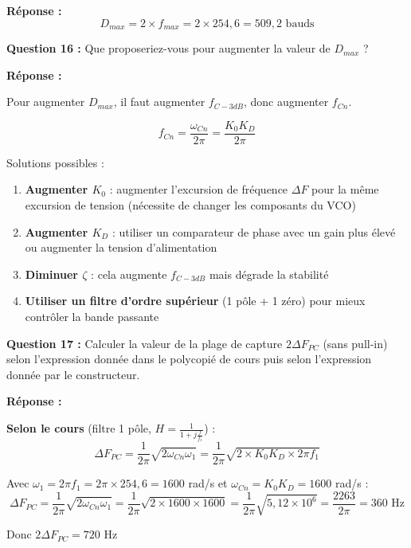 \documentclass[a4paper,11pt]{article}
\begin{document}
\vspace{0.3cm}
\textbf{Réponse :}
\[
D_{max} = 2 \times f_{max} = 2 \times 254{,}6 = \boxed{509{,}2 \text{ bauds}}
\]

\vspace{0.5cm}
\textbf{Question 16 :} Que proposeriez-vous pour augmenter la valeur de $D_{max}$ ?

\vspace{0.3cm}
\textbf{Réponse :}

Pour augmenter $D_{max}$, il faut augmenter $f_{C-3dB}$, donc augmenter $f_{Cn}$.

\[
f_{Cn} = \frac{\omega_{Cn}}{2\pi} = \frac{K_0 K_D}{2\pi}
\]

Solutions possibles :
\begin{enumerate}
    \item \textbf{Augmenter $K_0$} : augmenter l'excursion de fréquence $\Delta F$ pour la même excursion de tension (nécessite de changer les composants du VCO)
    \item \textbf{Augmenter $K_D$} : utiliser un comparateur de phase avec un gain plus élevé ou augmenter la tension d'alimentation
    \item \textbf{Diminuer $\zeta$} : cela augmente $f_{C-3dB}$ mais dégrade la stabilité
    \item \textbf{Utiliser un filtre d'ordre supérieur} (1 pôle + 1 zéro) pour mieux contrôler la bande passante
\end{enumerate}

\vspace{0.5cm}
\textbf{Question 17 :} Calculer la valeur de la plage de capture $2\Delta F_{PC}$ (sans pull-in) selon l'expression donnée dans le polycopié de cours puis selon l'expression donnée par le constructeur.

\vspace{0.3cm}
\textbf{Réponse :}

\textbf{Selon le cours} (filtre 1 pôle, $H = \frac{1}{1+j\frac{f}{f_1}}$) :
\[
\Delta F_{PC} = \frac{1}{2\pi}\sqrt{2 \omega_{Cn} \omega_1} = \frac{1}{2\pi}\sqrt{2 \times K_0 K_D \times 2\pi f_1}
\]

Avec $\omega_1 = 2\pi f_1 = 2\pi \times 254{,}6 = 1600$ rad/s et $\omega_{Cn} = K_0 K_D = 1600$ rad/s :
\[
\Delta F_{PC} = \frac{1}{2\pi}\sqrt{2 \omega_{Cn} \omega_1} = \frac{1}{2\pi}\sqrt{2 \times 1600 \times 1600} = \frac{1}{2\pi}\sqrt{5{,}12 \times 10^6} = \frac{2263}{2\pi} = \boxed{360 \text{ Hz}}
\]

Donc $2\Delta F_{PC} = \boxed{720 \text{ Hz}}$
\end{document}
